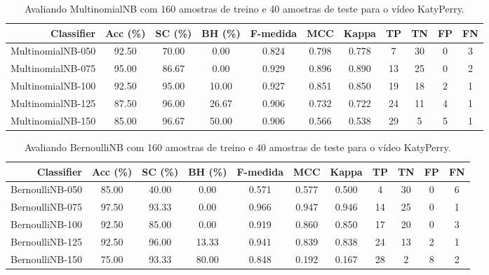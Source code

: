 \begin{table}[!htb]
\centering
\caption{Avaliando MultinomialNB com 160 amostras de treino e 40 amostras de teste para o vídeo KatyPerry.}
\label{tab:multinomial-nb-KatyPerry}
\begin{tabular}{r|c|c|c|c|c|c|c|c|c|c}
\hline\hline
Classifier & Acc (\%) & SC (\%) & BH (\%) & F-medida & MCC & Kappa & TP & TN & FP & FN \\ \hline
MultinomialNB-050 & 92.50 & 70.00 & 0.00 & 0.824 & 0.798 & 0.778 & 7 & 30 & 0 & 3 \\ 
MultinomialNB-075 & 95.00 & 86.67 & 0.00 & 0.929 & 0.896 & 0.890 & 13 & 25 & 0 & 2 \\ 
MultinomialNB-100 & 92.50 & 95.00 & 10.00 & 0.927 & 0.851 & 0.850 & 19 & 18 & 2 & 1 \\ 
MultinomialNB-125 & 87.50 & 96.00 & 26.67 & 0.906 & 0.732 & 0.722 & 24 & 11 & 4 & 1 \\ 
MultinomialNB-150 & 85.00 & 96.67 & 50.00 & 0.906 & 0.566 & 0.538 & 29 & 5 & 5 & 1 \\ 
\hline\hline
\end{tabular}
\end{table}
\begin{table}[!htb]
\centering
\caption{Avaliando BernoulliNB com 160 amostras de treino e 40 amostras de teste para o vídeo KatyPerry.}
\label{tab:bernoulli-nb-KatyPerry}
\begin{tabular}{r|c|c|c|c|c|c|c|c|c|c}
\hline\hline
Classifier & Acc (\%) & SC (\%) & BH (\%) & F-medida & MCC & Kappa & TP & TN & FP & FN \\ \hline
BernoulliNB-050 & 85.00 & 40.00 & 0.00 & 0.571 & 0.577 & 0.500 & 4 & 30 & 0 & 6 \\ 
BernoulliNB-075 & 97.50 & 93.33 & 0.00 & 0.966 & 0.947 & 0.946 & 14 & 25 & 0 & 1 \\ 
BernoulliNB-100 & 92.50 & 85.00 & 0.00 & 0.919 & 0.860 & 0.850 & 17 & 20 & 0 & 3 \\ 
BernoulliNB-125 & 92.50 & 96.00 & 13.33 & 0.941 & 0.839 & 0.838 & 24 & 13 & 2 & 1 \\ 
BernoulliNB-150 & 75.00 & 93.33 & 80.00 & 0.848 & 0.192 & 0.167 & 28 & 2 & 8 & 2 \\ 
\hline\hline
\end{tabular}
\end{table}
